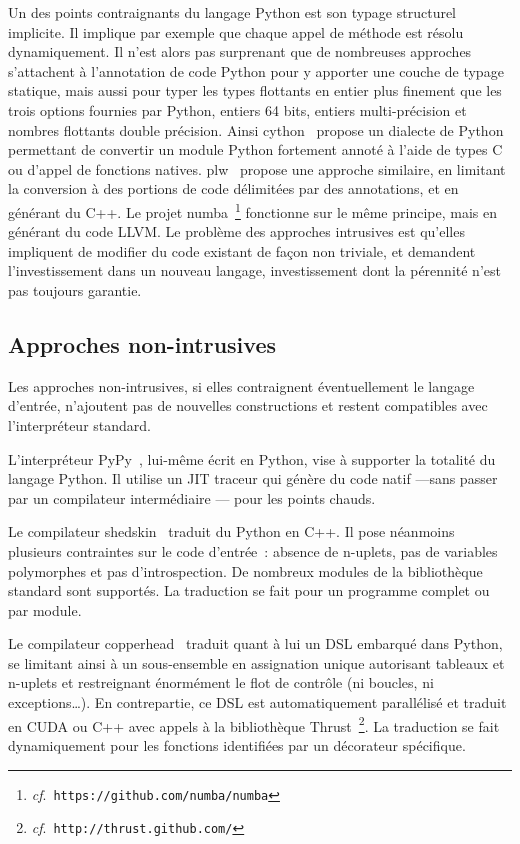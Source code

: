 \documentclass[renpar]{compas2013}
\begin{document}
Un des points contraignants du langage Python est son typage structurel
implicite. Il implique par exemple que chaque appel de méthode est résolu
dynamiquement. Il n'est alors pas surprenant que de nombreuses approches
s'attachent à l'annotation de code Python pour y apporter une couche de
typage statique, mais aussi pour typer les types flottants en entier plus
finement que les trois options fournies par Python, entiers 64 bits,
entiers multi-précision et nombres flottants double précision. Ainsi
cython~\cite{cython2010} propose un dialecte de Python permettant de
convertir un module Python fortement annoté à l'aide de types C ou d'appel
de fonctions natives. plw~\cite{dongara2007} propose une approche
similaire, en limitant la conversion à des portions de code délimitées par
des annotations, et en générant du C++. Le projet
numba~\footnote{\emph{cf}.\ \texttt{https://github.com/numba/numba}}
fonctionne sur le même principe, mais en générant du code LLVM.  Le
problème des approches intrusives est qu'elles impliquent de modifier du
code existant de façon non triviale, et demandent l'investissement dans un
nouveau langage, investissement dont la pérennité n'est pas toujours
garantie.

\subsection{Approches non-intrusives}

Les approches non-intrusives, si elles contraignent éventuellement le
langage d'entrée, n'ajoutent pas de nouvelles constructions et restent
compatibles avec l'interpréteur standard.

L'interpréteur PyPy~\cite{pypy2009}, lui-même écrit en Python, vise à
supporter la totalité du langage Python. Il utilise un JIT traceur qui
génère du code natif ---sans passer par un compilateur intermédiaire ---
pour les points chauds.

Le compilateur shedskin~\cite{shedskin2006} traduit du Python en C++. Il
pose néanmoins plusieurs contraintes sur le code d'entrée~: absence de
n-uplets, pas de variables polymorphes et pas d'introspection. De nombreux
modules de la bibliothèque standard sont supportés. La traduction se fait
pour un programme complet ou par module.

Le compilateur copperhead~\cite{copperhead2011} traduit quant à lui un DSL
embarqué dans Python, se limitant ainsi à un sous-ensemble en assignation
unique autorisant tableaux et n-uplets et restreignant énormément le flot
de contrôle (ni boucles, ni exceptions\dots). En contrepartie, ce DSL est
automatiquement parallélisé et traduit en CUDA ou C++ avec appels à la
bibliothèque Thrust~\footnote{\emph{cf}.\
\texttt{http://thrust.github.com/}}. La traduction se fait dynamiquement
pour les fonctions identifiées par un décorateur spécifique.
\end{document}
